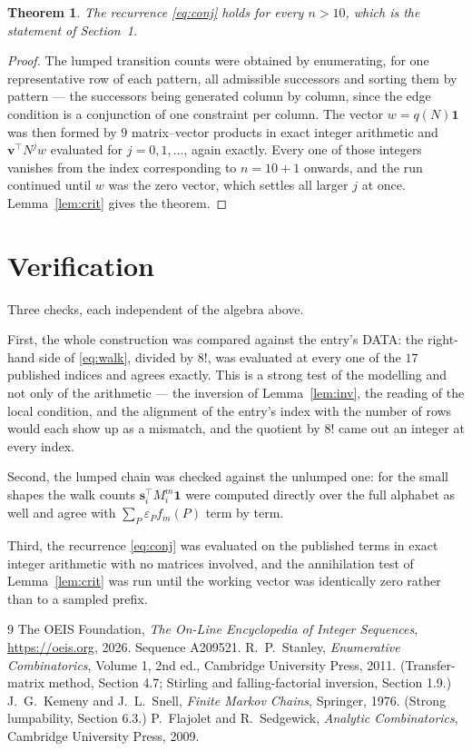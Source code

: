 \documentclass[11pt,a4paper]{article}
\theoremstyle{plain}
\newtheorem{theorem}{Theorem}
\theoremstyle{definition}
\begin{document}
\begin{theorem}
The recurrence \eqref{eq:conj} holds for every $n>10$, which is the statement of
Section~1.
\end{theorem}

\begin{proof}
The lumped transition counts were obtained by enumerating, for one representative row of
each pattern, all admissible successors and sorting them by pattern --- the successors being
generated column by column, since the edge condition is a conjunction of one constraint per
column. The vector $w=q(N)\mathbf{1}$ was then formed by $9$ matrix--vector products
in exact integer arithmetic and $\mathbf{v}^{\!\top}N^{j}w$ evaluated for
$j=0,1,\dots$, again exactly. Every one of those integers vanishes from the index
corresponding to $n=10+1$ onwards, and the run continued until $w$ was the zero vector,
which settles all larger $j$ at once. Lemma~\ref{lem:crit} gives the theorem.
\end{proof}

\section{Verification}

Three checks, each independent of the algebra above.

First, the whole construction was compared against the entry's DATA: the right-hand side of
\eqref{eq:walk}, divided by $8!$, was evaluated at every one of the $17$
published indices and agrees exactly. This is a strong test of the modelling and not only of
the arithmetic --- the inversion of Lemma~\ref{lem:inv}, the reading of the local
condition, and the alignment of the entry's index with the number of rows would each
show up as a mismatch, and the quotient by $8!$ came out an integer at every index.

Second, the lumped chain was checked against the unlumped one: for the small shapes the walk
counts $\mathbf{s}_i^{\!\top}M_i^{m}\mathbf{1}$ were computed directly over the full
alphabet as well and agree with $\sum_P\varepsilon_Pf_m(P)$ term by term.

Third, the recurrence \eqref{eq:conj} was evaluated on the published terms in exact integer
arithmetic with no matrices involved, and the annihilation test of Lemma~\ref{lem:crit} was
run until the working vector was identically zero rather than to a sampled prefix.

\begin{thebibliography}{9}
 The OEIS Foundation, \emph{The On-Line Encyclopedia of Integer
Sequences}, \url{https://oeis.org}, 2026. Sequence A209521.
 R.~P.~Stanley, \emph{Enumerative Combinatorics}, Volume 1, 2nd ed.,
Cambridge University Press, 2011. (Transfer-matrix method, Section 4.7; Stirling and
falling-factorial inversion, Section 1.9.)
 J.~G.~Kemeny and J.~L.~Snell, \emph{Finite Markov Chains}, Springer,
1976. (Strong lumpability, Section 6.3.)
 P.~Flajolet and R.~Sedgewick, \emph{Analytic Combinatorics}, Cambridge
University Press, 2009.
\end{thebibliography}
\end{document}
